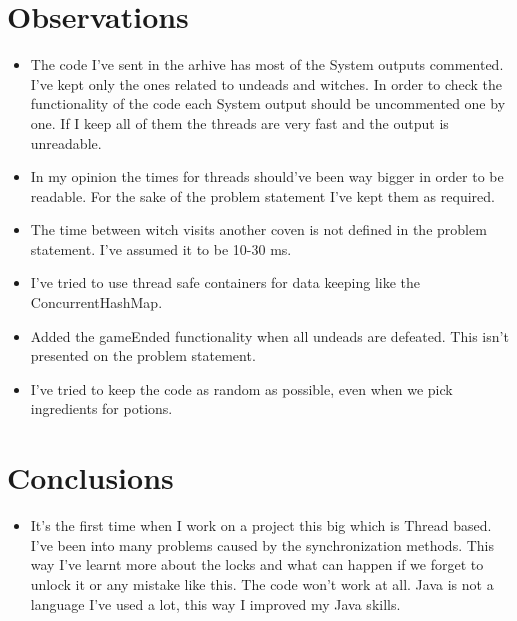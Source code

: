 \documentclass[14pt]{article}
\begin{document}
\section*{Observations}
\vspace{5 mm}
\begin{itemize}
            \item The code I've sent in the arhive has most of the System outputs commented. I've kept only the ones related to undeads and witches. In order to check the functionality of the code each System output should be uncommented one by one. If I keep all of them the threads are very fast and the output is unreadable.
            
            \item In my opinion the times for threads should've been way bigger in order to be readable. For the sake of the problem statement I've kept them as required.
            
            \item The time between witch visits another coven is not defined in the problem statement. I've assumed it to be 10-30 ms.
            
            \item I've tried to use thread safe containers for data keeping like the ConcurrentHashMap.
            
            \item Added the gameEnded functionality when all undeads are defeated. This isn't presented on the problem statement.
            
            \item I've tried to keep the code as random as possible, even when we pick ingredients for potions.
            
\end{itemize}

\section*{Conclusions}
\vspace{5 mm}
\begin{itemize}
            \item It's the first time when I work on a project this big which is Thread based. I've been into many problems caused by the synchronization methods. This way I've learnt more about the locks and what can happen if we forget to unlock it or any mistake like this. The code won't work at all. Java is not a language I've used a lot, this way I improved my Java skills. 
            
\end{itemize}
\end{document}
